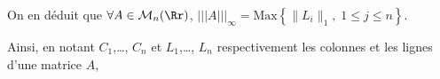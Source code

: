 {{On en déduit que $\forall A\in\mathcal{M}_n(\Rr)$, $|||A|||_\infty=\text{Max}\left\{\|L_i\|_1,\;1\leqslant j\leqslant n\right\}$.

Ainsi, en notant $C_1$,\ldots, $C_n$ et $L_1$,\ldots, $L_n$ respectivement les colonnes et les lignes d'une matrice $A$,

\begin{center}
\end{center}
}
}
